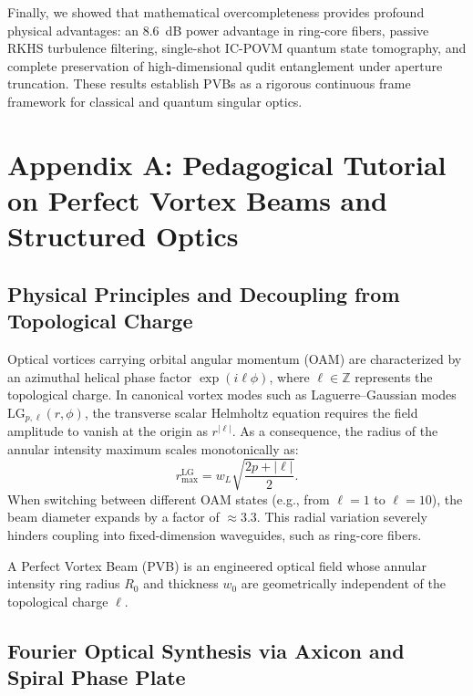 \documentclass{optica-article}
\begin{document}
Finally, we showed that mathematical overcompleteness provides profound physical advantages: an 8.6~dB power advantage in ring-core fibers, passive RKHS turbulence filtering, single-shot IC-POVM quantum state tomography, and complete preservation of high-dimensional qudit entanglement under aperture truncation. These results establish PVBs as a rigorous continuous frame framework for classical and quantum singular optics.

\appendix

\section{Appendix A: Pedagogical Tutorial on Perfect Vortex Beams and Structured Optics}
\label{app:primer}

\subsection{Physical Principles and Decoupling from Topological Charge}

Optical vortices carrying orbital angular momentum (OAM) are characterized by an azimuthal helical phase factor $\exp(i \ell \phi)$, where $\ell \in \mathbb{Z}$ represents the topological charge. In canonical vortex modes such as Laguerre--Gaussian modes $\text{LG}_{p, \ell}(r, \phi)$, the transverse scalar Helmholtz equation requires the field amplitude to vanish at the origin as $r^{|\ell|}$. As a consequence, the radius of the annular intensity maximum scales monotonically as:
\begin{equation}
r_{\max}^{\text{LG}} = w_L \sqrt{\frac{2p + |\ell|}{2}}.
\label{eq:app_lg_scaling}
\end{equation}
When switching between different OAM states (e.g., from $\ell=1$ to $\ell=10$), the beam diameter expands by a factor of $\approx 3.3$. This radial variation severely hinders coupling into fixed-dimension waveguides, such as ring-core fibers.

A Perfect Vortex Beam (PVB) is an engineered optical field whose annular intensity ring radius $R_0$ and thickness $w_0$ are geometrically independent of the topological charge $\ell$.

\subsection{Fourier Optical Synthesis via Axicon and Spiral Phase Plate}
\end{document}
